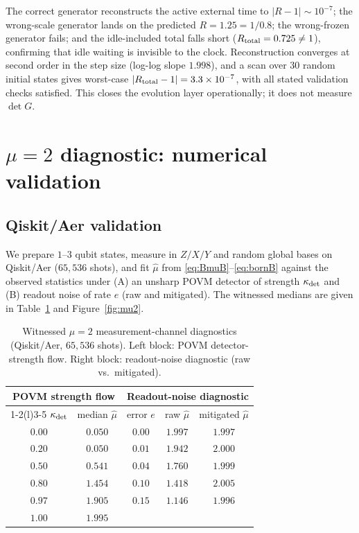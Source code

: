 \documentclass[11pt,a4paper]{article}
\theoremstyle{definition}
\begin{document}
The correct generator reconstructs the active external time to
$|R-1|\sim10^{-7}$; the wrong-scale generator lands on the predicted
$R=1.25=1/0.8$; the wrong-frozen generator fails; and the idle-included
total falls short ($R_{\rm total}=0.725\neq1$), confirming that idle
waiting is invisible to the clock. Reconstruction converges at second
order in the step size (log-log slope $1.998$), and a scan over $30$
random initial states gives worst-case
$|R_{\rm total}-1|=3.3\times10^{-7}$, with all stated validation checks
satisfied. This closes the
evolution layer operationally; it does not measure $\det G$.




\section{$\mu=2$ diagnostic: numerical validation}\label{app:mu2_num}

\subsection{Qiskit/Aer validation}

We prepare $1$--$3$ qubit states, measure in $Z/X/Y$ and random global
bases on Qiskit/Aer ($65{,}536$ shots), and fit $\hat\mu$ from
\eqref{eq:BmuB}--\eqref{eq:bornB} against the observed statistics under
(A) an unsharp POVM detector of strength $\kappa_{\rm det}$ and (B) readout noise of
rate $e$ (raw and mitigated). The witnessed medians are given in
Table~\ref{tab:mu2} and Figure~\ref{fig:mu2}.

\begin{table}[ht]
\centering
\caption{Witnessed $\mu=2$ measurement-channel diagnostics (Qiskit/Aer,
$65{,}536$ shots). Left block: POVM detector-strength flow. Right block:
readout-noise diagnostic (raw vs.\ mitigated).}
\begin{tabular}{cc@{\hskip 2.2em}ccc}
\toprule
\multicolumn{2}{c}{POVM strength flow} & \multicolumn{3}{c}{Readout-noise diagnostic}\\
\cmidrule(r){1-2}\cmidrule(l){3-5}
$\kappa_{\rm det}$ & median $\hat\mu$ & error $e$ & raw $\hat\mu$ & mitigated $\hat\mu$\\
\midrule
$0.00$ & $0.050$ & $0.00$ & $1.997$ & $1.997$\\
$0.20$ & $0.050$ & $0.01$ & $1.942$ & $2.000$\\
$0.50$ & $0.541$ & $0.04$ & $1.760$ & $1.999$\\
$0.80$ & $1.454$ & $0.10$ & $1.418$ & $2.005$\\
$0.97$ & $1.905$ & $0.15$ & $1.146$ & $1.996$\\
$1.00$ & $1.995$ & & & \\
\bottomrule
\end{tabular}
\label{tab:mu2}
\end{table}
\end{document}

